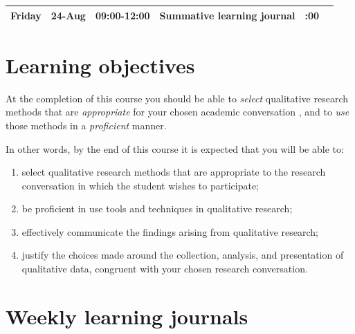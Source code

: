 \documentclass[]{book}
\providecommand{\tightlist}{%
  \setlength{\itemsep}{0pt}\setlength{\parskip}{0pt}}
\theoremstyle{definition}
\theoremstyle{definition}
\theoremstyle{definition}
\theoremstyle{remark}
\begin{document}
\begin{longtable}[]{@{}rllllr@{}}
\begin{minipage}[t]{0.12\columnwidth}
Friday\strut
\end{minipage} & \begin{minipage}[t]{0.09\columnwidth}\raggedright
24-Aug\strut
\end{minipage} & \begin{minipage}[t]{0.16\columnwidth}\raggedright
09:00-12:00\strut
\end{minipage} & \begin{minipage}[t]{0.29\columnwidth}\raggedright
Summative learning journal\strut
\end{minipage} & \begin{minipage}[t]{0.08\columnwidth}\raggedleft
17:00\strut
\end{minipage}\tabularnewline
\bottomrule
\end{longtable}

\hypertarget{LO}{%
\section{Learning objectives}\label{LO}}

At the completion of this course you should be able to \emph{select}
qualitative research methods that are \emph{appropriate} for your chosen
academic conversation \autocite{huff_2009_designingresearchpublication},
and to \emph{use} those methods in a \emph{proficient} manner.

In other words, by the end of this course it is expected that you will
be able to:

\begin{enumerate}
\def\labelenumi{\arabic{enumi}.}
\tightlist
\item
  select qualitative research methods that are appropriate to the
  research conversation in which the student wishes to participate;
\item
  be proficient in use tools and techniques in qualitative research;
\item
  effectively communicate the findings arising from qualitative
  research;
\item
  justify the choices made around the collection, analysis, and
  presentation of qualitative data, congruent with your chosen research
  conversation.
\end{enumerate}

\hypertarget{ass1}{%
\section{Weekly learning journals}\label{ass1}}
\end{document}
